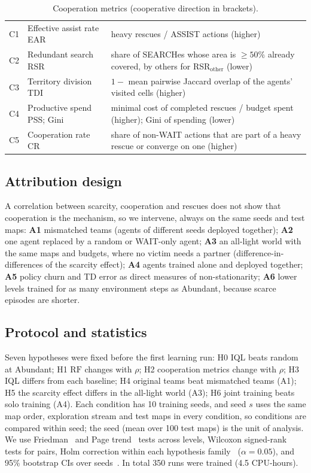 \documentclass{article}
\newcommand{\RF}{\mathrm{RF}}
\begin{document}
\begin{table}[h]
\centering\small
\caption{Cooperation metrics (cooperative direction in brackets).}
\label{tab:metrics}
\begin{tabularx}{\linewidth}{@{}llL@{}}
\toprule
C1 & Effective assist rate EAR & heavy rescues / ASSIST actions (higher) \\
C2 & Redundant search RSR & share of SEARCHes whose area is $\ge50\%$ already covered, by others for RSR$_{\text{other}}$ (lower) \\
C3 & Territory division TDI & $1-$ mean pairwise Jaccard overlap of the agents' visited cells (higher) \\
C4 & Productive spend PSS; Gini & minimal cost of completed rescues / budget spent (higher); Gini of spending (lower) \\
C5 & Cooperation rate CR & share of non-WAIT actions that are part of a heavy rescue or converge on one (higher) \\
\bottomrule
\end{tabularx}
\end{table}

\subsection{Attribution design}\label{sec:attr}
A correlation between scarcity, cooperation and rescues does not show that cooperation is the mechanism, so we
intervene, always on the same seeds and test maps: \textbf{A1} mismatched teams (agents of different seeds deployed
together); \textbf{A2} one agent replaced by a random or WAIT-only agent; \textbf{A3} an all-light world with the same
maps and budgets, where no victim needs a partner (difference-in-differences of the scarcity effect); \textbf{A4} agents
trained alone and deployed together; \textbf{A5} policy churn and TD error as direct measures of non-stationarity;
\textbf{A6} lower levels trained for as many environment steps as Abundant, because scarce episodes are shorter.

\subsection{Protocol and statistics}
Seven hypotheses were fixed before the first learning run: H0 IQL beats random at Abundant; H1 $\RF$ changes with
$\rho$; H2 cooperation metrics change with $\rho$; H3 IQL differs from each baseline; H4 original teams beat
mismatched teams (A1); H5 the scarcity effect differs in the all-light world (A3); H6 joint training beats solo
training (A4). Each condition has 10 training seeds, and seed $s$ uses the same map order, exploration stream and test
maps in every condition, so conditions are compared within seed; the seed (mean over 100 test maps) is the unit of
analysis. We use Friedman~\cite{friedman1937} and Page trend~\cite{page1963} tests across levels, Wilcoxon
signed-rank~\cite{wilcoxon1945} tests for pairs, Holm correction within each hypothesis family~\cite{holm1979}
($\alpha=0.05$), and 95\% bootstrap CIs over seeds~\cite{efron1979}. In total 350 runs were trained (4.5 CPU-hours).
\end{document}
